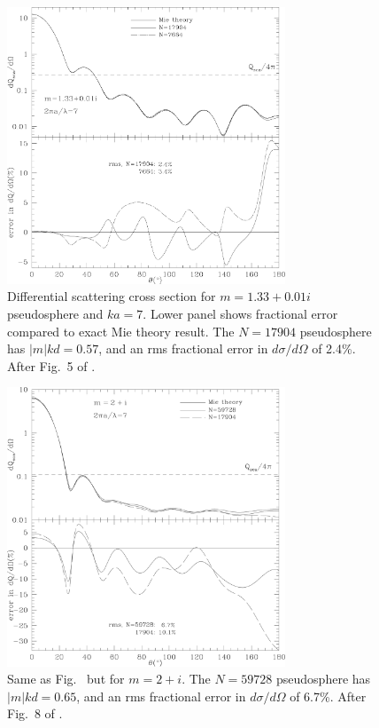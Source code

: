 \begin{figure}[t]
\begin{center}
\vspace*{-0.9cm}
\includegraphics[width=8.3cm]{f3.png}
\vspace*{-2.2cm}
\caption{\footnotesize
        Differential scattering cross section for 
	$m=1.33+0.01i$ pseudosphere and $ka=7$.
	Lower panel shows fractional error compared to exact Mie theory
	result.
	The $N=17904$ pseudosphere has $|m|kd=0.57$, and an rms fractional
	error in $d\sigma/d\Omega$ of 2.4\%.
	After Fig.\ 5 of \citet{Draine+Flatau_1994}.}
	\label{fig:dQdom=1.33+0.01i}
\end{center}
\end{figure}
\begin{figure}[h]
\begin{center}
\vspace*{-0.9cm}
\includegraphics[width=8.3cm]{f4.png}
\vspace*{-2.5cm}
\caption{\footnotesize
        Same as Fig.\ \protect{\ref{fig:dQdom=1.33+0.01i}}
	but for $m=2+i$.
	The $N=59728$ pseudosphere has $|m|kd=0.65$, and an rms fractional
	error in $d\sigma/d\Omega$ of 6.7\%.
	After Fig.\ 8 of \citet{Draine+Flatau_1994}.}
	\label{fig:dQdom=2+i}
\end{center}
\end{figure}

